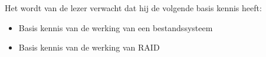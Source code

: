 Het wordt van de lezer verwacht dat hij de volgende basis kennis heeft:
\begin{itemize}
\item Basis kennis van de werking van een bestandssysteem
\item Basis kennis van de werking van RAID
\end{itemize}
